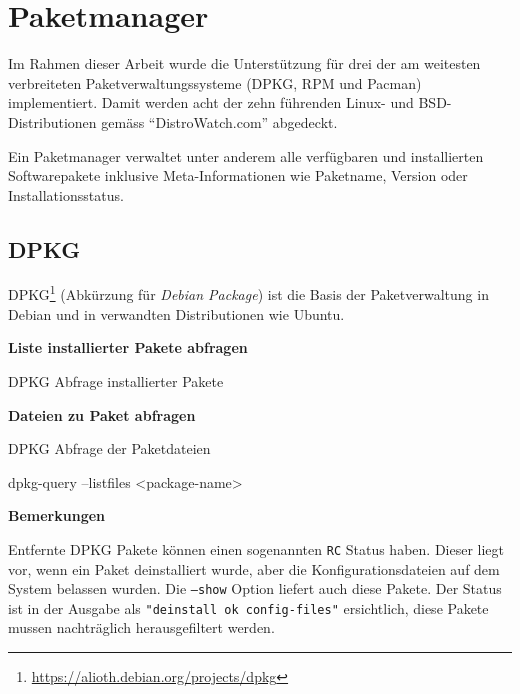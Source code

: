 

\section{Paketmanager}
\label{swidgenerator:paketmanager}

Im Rahmen dieser Arbeit wurde die Unterstützung für drei der am weitesten
verbreiteten Paketverwaltungssysteme (DPKG, RPM und Pacman) implementiert. Damit
werden acht der zehn führenden Linux- und BSD-Distributionen gemäss
\enquote{DistroWatch.com}\cite{distrowatch:2014} abgedeckt.

Ein Paketmanager verwaltet unter anderem alle verfügbaren und installierten
Softwarepakete inklusive Meta-Informationen wie Paketname, Version oder
Installationsstatus.

\subsection{DPKG}

DPKG\footnote{\url{https://alioth.debian.org/projects/dpkg}} (Abkürzung für
\textit{Debian Package}) ist die Basis der Paketverwaltung in Debian und in
verwandten Distributionen wie Ubuntu.

\textbf{Liste installierter Pakete abfragen}

\begin{listing}[H]
\caption{DPKG Abfrage installierter Pakete}
\end{listing}

\textbf{Dateien zu Paket abfragen}

\begin{listing}[H]
\caption{DPKG Abfrage der Paketdateien}
\begin{bashcode}
dpkg-query --listfiles <package-name>
\end{bashcode}
\end{listing}

\textbf{Bemerkungen}

Entfernte DPKG Pakete können einen sogenannten \texttt{RC} Status haben. Dieser liegt
vor, wenn ein Paket deinstalliert wurde, aber die Konfigurationsdateien auf dem
System belassen wurden. Die \texttt{---show} Option liefert auch diese Pakete.
Der Status ist in der Ausgabe als \texttt{"deinstall ok config-files"}
ersichtlich, diese Pakete mussen nachträglich herausgefiltert werden.


